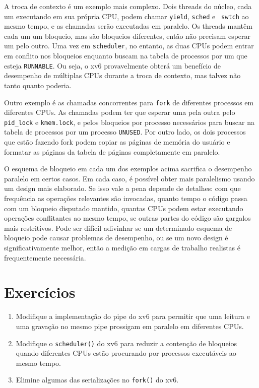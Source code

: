 A troca de contexto é um exemplo mais complexo. Dois threads do núcleo, cada um
executando em sua própria CPU, podem chamar {\tt yield}, {\tt sched} e {\tt
  swtch} ao mesmo tempo, e as chamadas serão executadas em paralelo. Os
threads mantêm cada um um bloqueio, mas são bloqueios diferentes, então não
precisam esperar um pelo outro. Uma vez em {\tt scheduler}, no entanto, as duas
CPUs podem entrar em conflito nos bloqueios enquanto buscam na tabela de processos
por um que esteja {\tt RUNNABLE}. Ou seja, o xv6 provavelmente obterá um
benefício de desempenho de múltiplas CPUs durante a troca de contexto, mas
talvez não tanto quanto poderia.

Outro exemplo é as chamadas concorrentes para {\tt fork} de diferentes
processos em diferentes CPUs. As chamadas podem ter que esperar uma pela outra
pelo {\tt pid\_lock} e {\tt kmem.lock}, e pelos bloqueios por processo
necessários para buscar na tabela de processos por um processo {\tt UNUSED}. Por
outro lado, os dois processos que estão fazendo fork podem copiar as páginas de
memória do usuário e formatar as páginas da tabela de páginas completamente em
paralelo.

O esquema de bloqueio em cada um dos exemplos acima sacrifica o desempenho
paralelo em certos casos. Em cada caso, é possível obter mais paralelismo
usando um design mais elaborado. Se isso vale a pena depende de detalhes:
com que frequência as operações relevantes são invocadas, quanto tempo o código
passa com um bloqueio disputado mantido, quantas CPUs podem estar executando
operações conflitantes ao mesmo tempo, se outras partes do código são gargalos
mais restritivos. Pode ser difícil adivinhar se um determinado esquema de
bloqueio pode causar problemas de desempenho, ou se um novo design é
significativamente melhor, então a medição em cargas de trabalho realistas é
frequentemente necessária.

\section{Exercícios}

\begin{enumerate}

\item Modifique a implementação do pipe do xv6 para permitir que uma leitura e
  uma gravação no mesmo pipe prossigam em paralelo em diferentes CPUs.

\item Modifique o \texttt{scheduler()} do xv6 para reduzir a contenção de
  bloqueios quando diferentes CPUs estão procurando por processos executáveis ao
  mesmo tempo.

\item Elimine algumas das serializações no \texttt{fork()} do xv6.

\end{enumerate}
